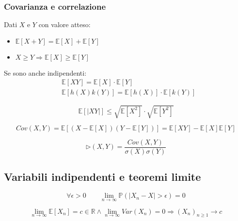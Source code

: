 \subsubsection{Covarianza e correlazione}
\begin{proposition}
	Dati $X$ e $Y$ con valore atteso:
	\begin{itemize}
		\item $\mathbb{E}[X+Y] = \mathbb{E}[X] + \mathbb{E}[Y]$ \\
		\item $X \geq Y \Longrightarrow \mathbb{E}[X] \geq \mathbb{E}[Y]$
	\end{itemize}
	Se sono anche indipendenti:
	\begin{align}
		& \mathbb{E}[XY] = \mathbb{E}[X] \cdot \mathbb{E}[Y] \\
		& \mathbb{E}[h(X)k(Y)] = \mathbb{E}[h(X)] \cdot \mathbb{E}[k(Y)] 
	\end{align}
\end{proposition}

\begin{proposition}
	\begin{equation}
		\mathbb{E}[\lvert XY \rvert] \leq \sqrt{\mathbb{E}[X^2]} \cdot \sqrt{\mathbb{E}[Y^2]}
	\end{equation}
\end{proposition}

\begin{definition}[Covarianza]
	\begin{equation}
		Cov(X,Y) = \mathbb{E}[(X - \mathbb{E}[X])(Y - \mathbb{E}[Y])] = \mathbb{E}[XY] - \mathbb{E}[X]\mathbb{E}[Y]
	\end{equation}
\end{definition}

\begin{definition}
	\begin{equation}
		\rhd(X,Y) = \frac{Cov(X,Y)}{\sigma(X)\sigma(Y)}
	\end{equation}
\end{definition}

\subsection{Variabili indipendenti e teoremi limite}
\begin{definition}
	\begin{equation}
		\forall \epsilon > 0 \quad\quad \lim_{n \to \infty} \mathbb{P}(\lvert X_n - X \rvert > \epsilon) = 0
	\end{equation}
\end{definition}
\begin{proposition}
	\begin{equation}
		\lim_{n \to \infty} \mathbb{E}[X_n] = c \in \mathbb{R} \land \lim_{n \to \infty} Var(X_n)=0 \Longrightarrow (X_n)_{n\geq 1} \longrightarrow c
	\end{equation}
\end{proposition}

